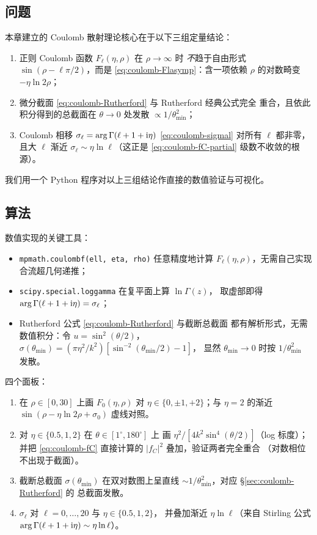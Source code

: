 \subsection*{问题}

本章建立的 Coulomb 散射理论核心在于以下三组定量结论：
\begin{enumerate}
  \item 正则 Coulomb 函数 $F_\ell(\eta,\rho)$ 在 $\rho\to\infty$ 时
    \emph{不}趋于自由形式 $\sin(\rho-\ell\pi/2)$，而是
    \eqref{eq:coulomb-Flasymp}：含一项依赖 $\rho$ 的对数畸变
    $-\eta\ln 2\rho$；
  \item 微分截面 \eqref{eq:coulomb-Rutherford} 与 Rutherford 经典公式完全
    重合，且依此积分得到的总截面在 $\theta\to 0$ 处发散
    $\propto 1/\theta_{\min}^2$；
  \item Coulomb 相移 $\sigma_\ell=\arg\Gamma(\ell+1+\mathrm{i}\eta)$
    \eqref{eq:coulomb-sigmal} 对所有 $\ell$ 都非零，且大 $\ell$ 渐近
    $\sigma_\ell\sim\eta\ln\ell$（这正是 \eqref{eq:coulomb-fC-partial}
    级数不收敛的根源）。
\end{enumerate}
我们用一个 Python 程序对以上三组结论作直接的数值验证与可视化。

\subsection*{算法}

数值实现的关键工具：
\begin{itemize}
  \item \texttt{mpmath.coulombf(ell, eta, rho)} 任意精度地计算
    $F_\ell(\eta,\rho)$，无需自己实现合流超几何递推；
  \item \texttt{scipy.special.loggamma} 在复平面上算 $\ln\Gamma(z)$，
    取虚部即得 $\arg\Gamma(\ell+1+\mathrm{i}\eta)=\sigma_\ell$；
  \item Rutherford 公式 \eqref{eq:coulomb-Rutherford} 与截断总截面
    都有解析形式，无需数值积分：令 $u=\sin^2(\theta/2)$，
    $\sigma(\theta_{\min})=(\pi\eta^2/k^2)[\sin^{-2}(\theta_{\min}/2)-1]$，
    显然 $\theta_{\min}\to 0$ 时按 $1/\theta_{\min}^2$ 发散。
\end{itemize}

四个面板：
\begin{enumerate}
  \item[(1)] 在 $\rho\in[0,30]$ 上画 $F_0(\eta,\rho)$ 对
    $\eta\in\{0,\pm 1,+2\}$；与 $\eta=2$ 的渐近 $\sin(\rho-\eta\ln 2\rho+\sigma_0)$
    虚线对照。
  \item[(2)] 对 $\eta\in\{0.5,1,2\}$ 在 $\theta\in[1^\circ,180^\circ]$ 上
    画 $\eta^2/[4k^2\sin^4(\theta/2)]$（log 标度）；并把
    \eqref{eq:coulomb-fC} 直接计算的 $|f_C|^2$ 叠加，验证两者完全重合
    （对数相位不出现于截面）。
  \item[(3)] 截断总截面 $\sigma(\theta_{\min})$ 在双对数图上呈直线
    $\sim 1/\theta_{\min}^2$，对应 \S\ref{sec:coulomb-Rutherford} 的
    总截面发散。
  \item[(4)] $\sigma_\ell$ 对 $\ell=0,\dots,20$ 与 $\eta\in\{0.5,1,2\}$，
    并叠加渐近 $\eta\ln\ell$（来自 Stirling 公式
    $\arg\Gamma(\ell+1+\mathrm{i}\eta)\sim\eta\ln\ell$）。
\end{enumerate}

